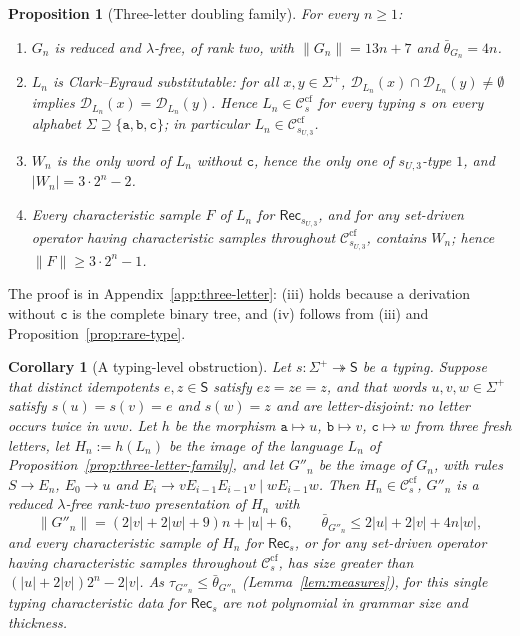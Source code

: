 \documentclass[11pt]{article}
\numberwithin{equation}{section}
\theoremstyle{plain}
\newtheorem{proposition}[theorem]{Proposition}
\newtheorem{corollary}[theorem]{Corollary}
\theoremstyle{definition}
\theoremstyle{remark}
\theoremstyle{plain}
\newcommand{\cf}{\mathrm{cf}}
\newcommand{\Ccf}[1]{\mathcal C_{#1}^{\cf}}
\newcommand{\Rec}{\mathsf{Rec}}
\newcommand{\D}{\mathcal{D}}
\begin{document}
\begin{proposition}[Three-letter doubling family]
\label{prop:bracketed-family}
\label{prop:three-letter-family}
For every $n\ge1$:
\begin{enumerate}[label=\textup{(\roman*)},leftmargin=*]
\item $G_n$ is reduced and $\lambda$-free, of rank two, with
$\|G_n\|=13n+7$ and $\bar\theta_{G_n}=4n$.
\item $L_n$ is Clark--Eyraud substitutable: for all $x,y\in\Sigma^+$,
$\D_{L_n}(x)\cap\D_{L_n}(y)\ne\emptyset$ implies
$\D_{L_n}(x)=\D_{L_n}(y)$. Hence $L_n\in\Ccf{s}$ for every
typing $s$ on every alphabet $\Sigma\supseteq\{\mathtt a,\mathtt b,\mathtt c\}$; in
particular $L_n\in\Ccf{s_{U,3}}$.
\item $W_n$ is the only word of $L_n$ without $\mathtt c$, hence the only one of
$s_{U,3}$-type $1$, and $|W_n|=3\cdot2^n-2$.
\item Every characteristic sample $F$ of $L_n$ for $\Rec_{s_{U,3}}$, and for any
set-driven operator having characteristic samples throughout $\Ccf{s_{U,3}}$,
contains $W_n$; hence $\|F\|\ge3\cdot2^n-1$.
\end{enumerate}
\end{proposition}

The proof is in Appendix~\ref{app:three-letter}: (iii) holds because a
derivation without $\mathtt c$ is the complete binary tree, and (iv) follows from
(iii) and Proposition~\ref{prop:rare-type}.

\begin{corollary}[A typing-level obstruction]
\label{cor:typing-level-obstruction}
Let $s:\Sigma^+\twoheadrightarrow\mathsf S$ be a typing.
Suppose that distinct idempotents $e,z\in\mathsf S$ satisfy $ez=ze=z$, and that
words $u,v,w\in\Sigma^+$ satisfy $s(u)=s(v)=e$ and $s(w)=z$ and are
\emph{letter-disjoint}: no letter occurs twice in $uvw$.  Let $h$ be the morphism
$\mathtt a\mapsto u$, $\mathtt b\mapsto v$, $\mathtt c\mapsto w$ from three fresh
letters, let $H_n:=h(L_n)$ be the image of the language $L_n$ of
Proposition~\ref{prop:three-letter-family},
and let $G''_n$ be the image of $G_n$, with rules $S\to E_n$, $E_0\to u$ and
$E_i\to vE_{i-1}E_{i-1}v\mid wE_{i-1}w$.  Then $H_n\in\Ccf{s}$, $G''_n$ is a
reduced $\lambda$-free rank-two presentation of $H_n$ with
\[
 \|G''_n\|=(2|v|+2|w|+9)n+|u|+6,\qquad
 \bar\theta_{G''_n}\le2|u|+2|v|+4n|w|,
\]
and every characteristic sample of $H_n$ for $\Rec_s$, or for any set-driven
operator having characteristic samples throughout $\Ccf{s}$, has size greater
than $(|u|+2|v|)2^n-2|v|$.  As $\tau_{G''_n}\le\bar\theta_{G''_n}$
(Lemma~\ref{lem:measures}), for this single typing characteristic data for
$\Rec_s$ are not polynomial in grammar size and thickness.
\end{corollary}
\end{document}
